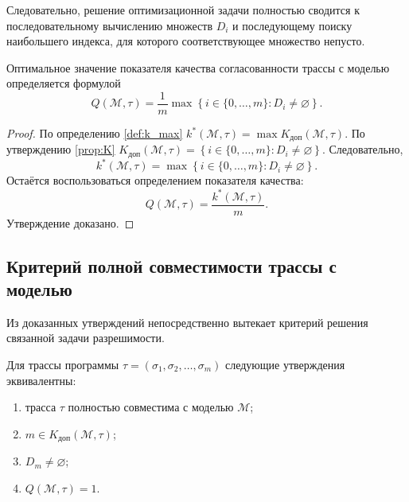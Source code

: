 Следовательно, решение оптимизационной задачи полностью сводится к
последовательному вычислению множеств $D_i$ и последующему поиску наибольшего
индекса, для которого соответствующее множество непусто.

\begin{proposition}\label{th:Q}
Оптимальное значение показателя качества согласованности трассы с моделью
определяется формулой
\[
Q(\mathcal{M},\tau)
=
\frac{1}{m}
\max
\left\{
i \in \{0,\dots,m\} : D_i \neq \varnothing
\right\}.
\]
\end{proposition}

\begin{proof}
По определению \ref{def:k_max}
$k^*(\mathcal{M},\tau)=\max K_{\mathrm{доп}}(\mathcal{M},\tau)$.
По утверждению \ref{prop:K}
$K_{\mathrm{доп}}(\mathcal{M},\tau)
=
\left\{
i \in \{0,\dots,m\} : D_i \neq \varnothing
\right\}.
$
Следовательно,
\[
k^*(\mathcal{M},\tau)
=
\max
\left\{
i \in \{0,\dots,m\} : D_i \neq \varnothing
\right\}.
\]
Остаётся воспользоваться определением показателя качества:
\[
Q(\mathcal{M},\tau)=\frac{k^*(\mathcal{M},\tau)}{m}.
\]
Утверждение доказано.
\end{proof}

\subsection{Критерий полной совместимости трассы с моделью}

Из доказанных утверждений непосредственно вытекает критерий решения связанной
задачи разрешимости.

\begin{proposition}\label{th:decision}
Для трассы программы $\tau=(\sigma_1,\sigma_2,\dots,\sigma_m)$ следующие
утверждения эквивалентны:
\begin{enumerate}
    \item трасса $\tau$ полностью совместима с моделью $\mathcal{M}$;
    \item $m \in K_{\mathrm{доп}}(\mathcal{M},\tau)$;
    \item $D_m \neq \varnothing$;
    \item $Q(\mathcal{M},\tau)=1$.
\end{enumerate}
\end{proposition}

